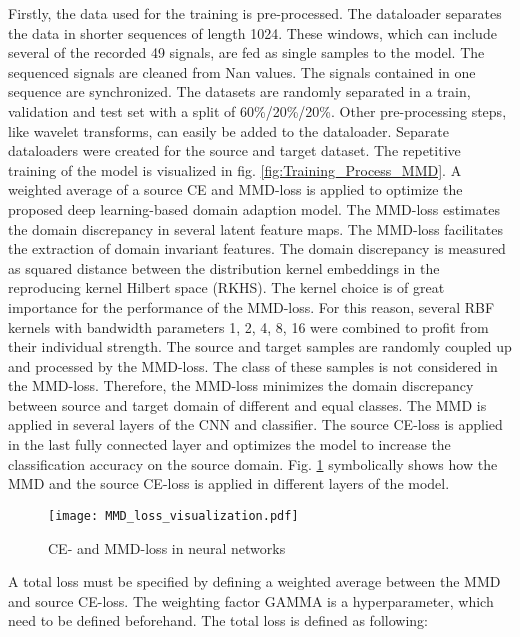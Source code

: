 Firstly, the data used for the training is pre-processed. The dataloader separates the data in shorter sequences of length 1024. These windows, which can include several of the recorded 49 signals, are fed as single samples to the model. The sequenced signals are cleaned from Nan values. The signals contained in one sequence are synchronized. The datasets are randomly separated in a train, validation and test set with a split of 60\%/20\%/20\%. Other pre-processing steps, like wavelet transforms, can easily be added to the dataloader. Separate dataloaders were created for the source and target dataset. The repetitive training of the model is visualized in fig. \ref{fig:Training_Process_MMD}. A weighted average of a source CE and MMD-loss is applied to optimize the proposed deep learning-based domain adaption model. The MMD-loss estimates the domain discrepancy in several latent feature maps. The MMD-loss facilitates the extraction of domain invariant features. The domain discrepancy is measured as squared distance between the distribution kernel embeddings in the reproducing kernel Hilbert space (RKHS). The kernel choice is of great importance for the performance of the MMD-loss. For this reason, several RBF kernels with bandwidth parameters 1, 2, 4, 8, 16 were combined to profit from their individual strength. The source and target samples are randomly coupled up and processed by the MMD-loss. The class of these samples is not considered in the MMD-loss. Therefore, the MMD-loss minimizes the domain discrepancy between source and target domain of different and equal classes. The MMD is applied in several layers of the CNN and classifier. The source CE-loss is applied in the last fully connected layer and optimizes the model to increase the classification accuracy on the source domain. Fig. \ref{fig:MMD_Loss_and_CE_loss} symbolically shows how the MMD and the source CE-loss is applied in different layers of the model.



\begin{figure}[H]
  \centering
  \texttt{[image: MMD\_loss\_visualization.pdf]}
  \caption {CE- and MMD-loss in neural networks} \label{fig:MMD_Loss_and_CE_loss}
\end{figure}
 
A total loss must be specified by defining a weighted average between the MMD and source CE-loss. The weighting factor GAMMA is a hyperparameter, which need to be defined beforehand. The total loss is defined as following:


